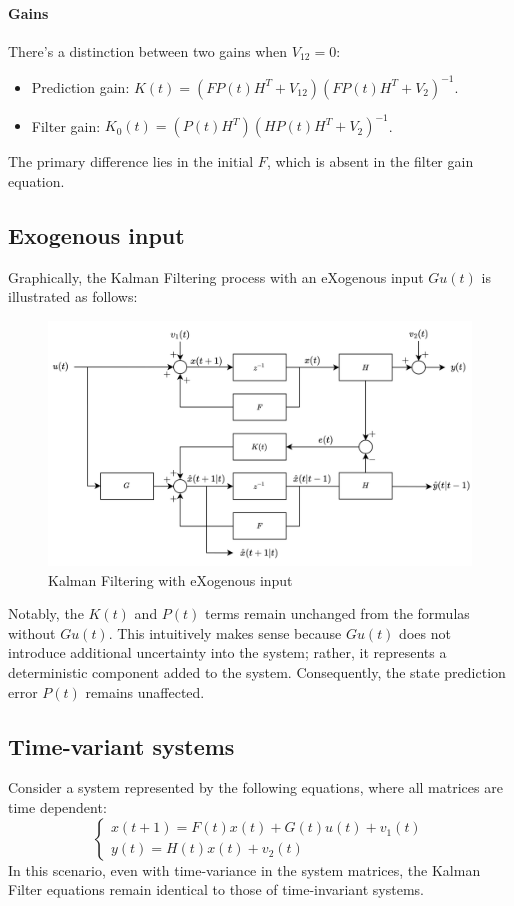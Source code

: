 \paragraph*{Gains}
There's a distinction between two gains when $V_{12}=0$: 
\begin{itemize}
    \item Prediction gain: $K(t)=\left(FP(t)H^T+V_{12}\right)\left(FP(t)H^T+V_2\right)^{-1}$.
    \item Filter gain: $K_0(t)=\left(P(t)H^T\right)\left(HP(t)H^T+V_2\right)^{-1}$.
\end{itemize}
The primary difference lies in the initial $F$, which is absent in the filter gain equation.

\subsection{Exogenous input}
Graphically, the Kalman Filtering process with an eXogenous input $Gu(t)$ is illustrated as follows:
\begin{figure}[H]
    \centering
    \includegraphics[width=0.75\linewidth]{images/ke.png}
    \caption{Kalman Filtering with eXogenous input}
\end{figure}
Notably, the $K(t)$ and $P(t)$ terms remain unchanged from the formulas without $Gu(t)$. 
This intuitively makes sense because $Gu(t)$ does not introduce additional uncertainty into the system; rather, it represents a deterministic component added to the system. 
Consequently, the state prediction error $P(t)$ remains unaffected.

\subsection{Time-variant systems}
Consider a system represented by the following equations, where all matrices are time dependent:
\[\begin{cases}
    x(t+1)=F(t)x(t)+G(t)u(t)+v_1(t) \\
    y(t)=H(t)x(t)+v_2(t)
\end{cases}\]
In this scenario, even with time-variance in the system matrices, the Kalman Filter equations remain identical to those of time-invariant systems.